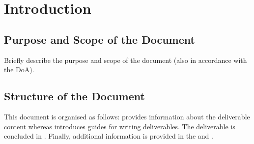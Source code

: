 
\clearpage
\section{Introduction}
\label{sec:introduction}


\subsection{Purpose and Scope of the Document}
\label{sec:purpose}

Briefly describe the purpose and scope of the document (also in accordance with the \ac{DoA}).



\subsection{Structure of the Document}
\label{sec:structure}

This document is organised as follows:  provides information about the deliverable content whereas  introduces guides for writing \hyperride{} deliverables. The deliverable is concluded in . Finally, additional information is provided in the  and .

